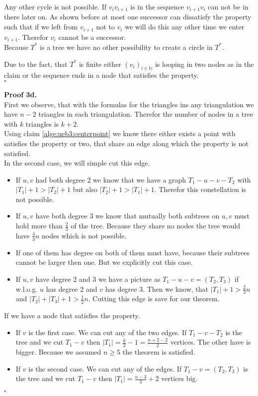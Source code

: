 \documentclass[11pt,a4paper,ngerman]{article}
\begin{document}
Any other cycle is not possible. If $v_{i}v_{i+1}$ is in the sequence $v_{i+1}v_i$ can not be in there later on.
As shown before at most one successor can dissatisfy the property such that if we left from $v_{i+1}$ not to $v_i$ we
will do this any other time we enter $v_{i+1}$. Therefor $v_i$ cannot be a successor.\\

Because $T^*$ is a tree we have no other possibility to create a circle in $T^*$.

Due to the fact, that $T^*$ is finite either $(v_i)_{i \in \mathbb{N}}$ is looping in two nodes as in the claim
or the sequence ends in a node that satisfies the property.\\
\mbox{}\hfill $\square$

\textbf{Proof 3d.}\\
First we observe, that with the formulas for the triangles ins any triangulation we have $n-2$ triangles in
each triangulation. Therefor the number of nodes in a tree with $k$ triangles is $k+2$.\\

Using claim \ref{alge:ueb3:centerpoint} we know there either exists a point with satisfies the property or two,
that share an edge along which the property is not satisfied.\\

In the second case, we will simple cut this edge.
\begin{itemize}
     \item If $u,v$ had both degree $2$ we know that we have a graph $T_1 - u - v - T_2$
        with $|T_1| + 1 > |T_2| + 1$ but also $|T_2| + 1 > |T_1| + 1$. Therefor this
        constellation is not possible.
    \item If $u,v$ have both degree $3$ we know that mutually both subtrees on $u,v$ must hold
        more than $\frac{2}{3}$ of the tree. Because they share no nodes the tree would have $\frac{4}{3}n$ nodes
        which is not possible.
    \item If one of them has degree on both of them must have, because their subtrees cannot be larger then one.
        But we explicitly cut this case.
    \item If $u,v$ have degree 2 and 3 we have a picture as $T_1 - u - v = (T_2, T_3)$ if w.l.o.g. $u$ has degree
        $2$ and $v$ has degree $3$. Then we know, that $|T_1| + 1 > \frac{2}{3}n$ and $|T_2| + |T_3| + 1 > \frac{1}{2} n$.
        Cutting this edge is save for our theorem.
\end{itemize}

If we have a node that satisfies the property.
\begin{itemize}
    \item If $v$ is the first case. We can cut any of the two edges. If $T_1 - v - T_2$ is
        the tree and we cut $T_1 - v$ then $|T_1| = \frac{k}{2} -1 = \frac{n+2 - 2}{2}$ vertices. The other have is bigger.
        Because we assumed $n \geq 5$ the theorem is satisfied.
    \item If $v$ is the second case. We can cut any of the edges. If $T_1 - v = (T_2, T_3)$ is the
        tree and we cut $T_1 - v$ then $|T_1| = \frac{n-3}{3} + 2$ vertices big.
\end{itemize}
\mbox{}\hfill $\square$
\label{LastPage}
\end{document}
